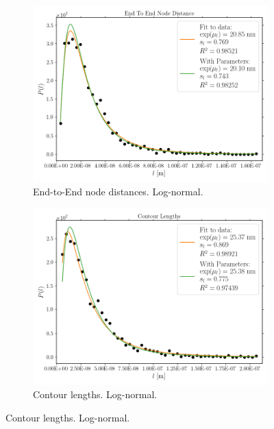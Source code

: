 \begin{figure}[H]
\begin{subfigure}{0.5\textwidth}
  \end{subfigure}\\[1ex]
  \begin{subfigure}{0.5\textwidth}
    \centering
    \includegraphics[width=0.99\linewidth]{Figures/chapter-image/pipeline_screenshots/pectin_ete_distance_c_m_iPA_iShort2_bins50.png}
    \caption{End-to-End node distances. Log-normal.}
    \label{subfig:pectin_ete}
  \end{subfigure}%
  \begin{subfigure}{0.5\textwidth}
    \centering
    \includegraphics[width=0.99\linewidth]{Figures/chapter-image/pipeline_screenshots/pectin_contour_length_c_m_iPA_iShort2_bins50.png}
    \caption{Contour lengths. Log-normal.}
    \label{subfig:pectin_contour}

\end{subfigure}
\end{figure}
